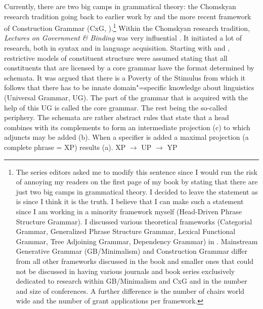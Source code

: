 Currently, there are two big camps in grammatical theory: the Chomskyan research tradition
\citep{Chomsky81a,Chomsky95a-u} going back to earlier work by \citet{Chomsky57a} and the
more recent framework of Construction Grammar (CxG,
\citealt*{FKoC88a,Goldberg95a,Goldberg2006a,Tomasello2003a}).\footnote{%
  The series editors asked me to modify this sentence since I would run the risk of annoying my
  readers on the first page of my book by stating that there are just two big camps in grammatical theory. I decided to leave the statement as is
  since I think it is the truth. I believe that I can make such a statement since I am working in a
  minority framework myself (Head-Driven Phrase Structure Grammar). I discussed various theoretical frameworks (Categorial Grammar,
  Generalized Phrase Structure Grammar, Lexical Functional Grammar, Tree Adjoining Grammar,
  Dependency Grammar) in . Mainstream Generative Grammar (GB/Minimalism) and Construction Grammar
  differ from all other frameworks discussed in the book and smaller ones that could not be discussed
  in having various journals and book series exclusively dedicated to research within GB/Minimalism
  and CxG and in the number and size of conferences. A further difference is the number of chairs world wide and
  the number of grant applications per framework.
}
Within the Chomskyan research tradition, \emph{Lectures on Government \& Binding} was very
influential \citep{Chomsky81a}. It initiated a lot of research, both 
in syntax and in language acquisition. Starting with \citet{Chomsky73a} and \citet{Jackendoff77a},
restrictive models of constituent structure were assumed stating that all constituents that are
licensed by a core grammar have the format determined by \xbar schemata. It was argued that there is
a Poverty of the Stimulus from which it follows that there has to be innate domain"=specific
knowledge about linguistics (Universal Grammar, UG). The part of the grammar that is acquired with
the help of this UG is called the core grammar. The rest being the so-called periphery. The \xbar
schemata are rather abstract rules that state that a head combines with its complements to form an
intermediate projection (c) to which adjuncts may be added (b). When a specifier is added a maximal
projection (a complete phrase = XP) results (a).
\eal
\ex XP $\to$ UP \xbar
\ex \xbar $\to$ \xbar YP
